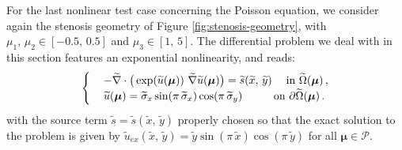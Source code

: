 \documentclass[12pt, a4paper, twoside, openright]{report}
\numberwithin{equation}{chapter}
\theoremstyle{theorem}
\theoremstyle{definition}
\theoremstyle{remark}
\theoremstyle{proposition}
\numberwithin{figure}{chapter}
\newcommand{\wt}[1]{\widetilde{#1}}
\newcommand{\bg}[1]{\boldsymbol{#1}}
\begin{document}
		For the last nonlinear test case concerning the Poisson equation, we consider again the stenosis geometry of Figure \ref{fig:stenosis-geometry}, with $\mu_1, \, \mu_2 \in [-0.5, \, 0.5]$ and $\mu_3 \in [1, \, 5]$. The differential problem we deal with in this section features an exponential nonlinearity, and reads:
		\begin{equation}
			\label{eq:poisson2d-3}
			\begin{cases}
				& - \wt{\nabla} \cdot \big( \exp(\wt{u}(\bg{\mu})) ~ \wt{\nabla} \wt{u}(\bg{\mu}) \big) = \wt{s}(\wt{x}, \, \wt{y}) \hspace*{0.45cm} \text{in $\wt{\Omega}(\bg{\mu})$} \, , \\
				& \wt{u}(\bg{\mu}) = \wt{\sigma}_x \sin(\pi \, \wt{\sigma}_x) \cos(\pi \, \wt{\sigma}_y) \hspace*{1.0cm} \text{on $\partial \wt{\Omega}(\bg{\mu})$} \, .
			\end{cases}
		\end{equation}
		with the source term $\wt{s} = \wt{s}(\wt{x}, \, \wt{y})$ properly chosen so that the exact solution to the problem is given by $\wt{u}_{ex}(\wt{x}, \, \wt{y}) = \wt{y} \sin(\pi \, \wt{x}) \cos(\pi \, \wt{y})$ for all $\bg{\mu} \in \mathcal{P}$.
		
\end{document}
